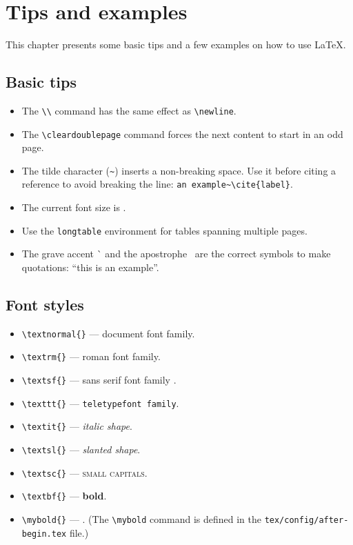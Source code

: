 \chapter{Tips and examples}
\label{ch:tips-and-examples}

This chapter presents some basic tips and a few examples on how to use \LaTeX.

\section{Basic tips}
\label{sec:basic-tips}

\begin{itemize}
\item
The \verb+\\+ command has the same effect as \verb+\newline+.
\item
The \verb+\cleardoublepage+ command forces the next content to start in an odd page.
\item
The tilde character (\verb+~+) inserts a non-breaking space. Use it before citing a reference to avoid breaking the line: \verb+an example~\cite{label}+.
\item
The current font size is \myfontsize.
\item
Use the \verb+longtable+ environment for tables spanning multiple pages.
\item
The grave accent \`{} and the apostrophe \textquotesingle\ are the correct symbols to make quotations: ``this is an example''.
\end{itemize}

\section{Font styles}
\label{sec:font-styles}

\begin{itemize}
\item
\verb+\textnormal{}+ --- \textnormal{document font family}.
\item
\verb+\textrm{}+ --- \textrm{roman font family}.
\item
\verb+\textsf{}+ --- \textsf{sans serif font family }.
\item
\verb+\texttt{}+ --- \texttt{teletypefont family}.
\item
\verb+\textit{}+ --- \textit{italic shape}.
\item
\verb+\textsl{}+ --- \textsl{slanted shape}.
\item
\verb+\textsc{}+ --- \textsc{small capitals}.
\item
\verb+\textbf{}+ --- \textbf{bold}.
\item
\verb+\mybold{}+ --- . (The \verb+\mybold+ command is defined in the \verb+tex/config/after-begin.tex+ file.)
\end{itemize}

